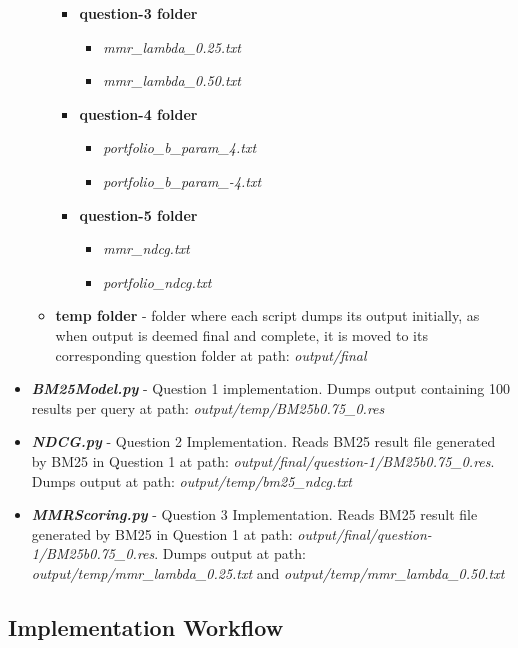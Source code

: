 \documentclass{article} %
\begin{document}
\begin{itemize}
\begin{itemize}
\begin{itemize}
            \item \textbf{question-3 folder}
            \begin{itemize}
                \item \textit{mmr\_lambda\_0.25.txt}
                \item \textit{mmr\_lambda\_0.50.txt}
            \end{itemize}
            \item \textbf{question-4 folder}
            \begin{itemize}
                \item \textit{portfolio\_b\_param\_4.txt}
                \item \textit{portfolio\_b\_param\_-4.txt}
            \end{itemize}
            \item \textbf{question-5 folder}
            \begin{itemize}
                \item \textit{mmr\_ndcg.txt}
                \item \textit{portfolio\_ndcg.txt}
            \end{itemize}
        \end{itemize}
        \item \textbf{temp folder} - folder where each script dumps its output initially, as when output is deemed final and complete, it is moved to its corresponding question folder at path: \textit{output/final}
    \end{itemize}
    \item \textit{\textbf{BM25Model.py}} - Question 1 implementation. Dumps output containing 100 results per query at path: \textit{output/temp/BM25b0.75\_0.res}
    \item \textit{\textbf{NDCG.py}} - Question 2 Implementation. Reads BM25 result file generated by BM25 in Question 1 at path: \textit{output/final/question-1/BM25b0.75\_0.res}. Dumps output at path: \textit{output/temp/bm25\_ndcg.txt}
    \item \textit{\textbf{MMRScoring.py}} - Question 3 Implementation. Reads BM25 result file generated by BM25 in Question 1 at path: \textit{output/final/question-1/BM25b0.75\_0.res}. Dumps output at path: \textit{output/temp/mmr\_lambda\_0.25.txt} and \textit{output/temp/mmr\_lambda\_0.50.txt}
\end{itemize}

\subsection*{Implementation Workflow}
\end{document}
